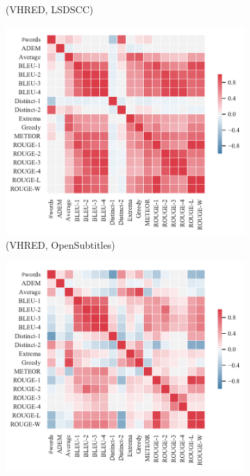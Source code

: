 \begin{figure}[htbp]
\begin{subfigure}{0.33\linewidth}
        \caption{(VHRED, LSDSCC)}
    \end{subfigure}%
    \begin{subfigure}{0.33\linewidth}
        \centering
        \includegraphics[width=\linewidth]{figure/plot/heatmap/v4/pearson/vhred/opensub/plot.pdf}
        \caption{(VHRED, OpenSubtitles)}
    \end{subfigure}%
    \begin{subfigure}{0.33\linewidth}
        \centering
        \includegraphics[width=\linewidth]{figure/plot/heatmap/v4/pearson/vhred/ubuntu/plot.pdf}

\end{subfigure}
\end{figure}
